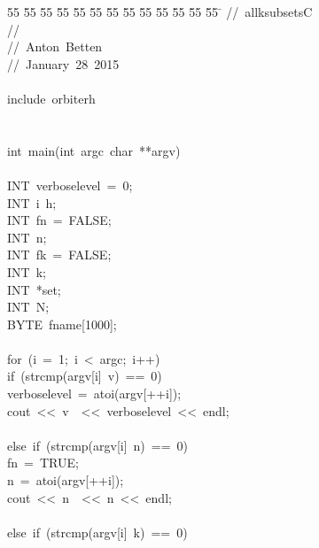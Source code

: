 %
%
\begin{tabbing}
55 \= 55 \= 55 \= 55 \= 55 \= 55 \= 55 \= 55 \= 55 \= 55 \= 55 \= 55 \= 55 \= \kill
//\ allksubsetsC\\[0pt]
//\ \\[0pt]
//\ Anton\ Betten\\[0pt]
//\ January\ 28\ 2015\\[0pt]
\\[0pt]
include\ orbiterh\\[0pt]
\\[0pt]
\\[0pt]
int\ main(int\ argc\ char\ **argv)\\[0pt]
\\[0pt]
\>INT\ verboselevel\ =\ 0;\\[0pt]
\>INT\ i\ h;\\[0pt]
\>INT\ fn\ =\ FALSE;\\[0pt]
\>INT\ n;\\[0pt]
\>INT\ fk\ =\ FALSE;\\[0pt]
\>INT\ k;\\[0pt]
\>INT\ *set;\\[0pt]
\>INT\ N;\\[0pt]
\>BYTE\ fname[1000];\\[0pt]
\\[0pt]
\>for\ (i\ =\ 1;\ i\ <\ argc;\ i++)\ \\[0pt]
\>\>if\ (strcmp(argv[i]\ v)\ ==\ 0)\ \\[0pt]
\>\>\>verboselevel\ =\ atoi(argv[++i]);\\[0pt]
\>\>\>cout\ <<\ v\ \ <<\ verboselevel\ <<\ endl;\\[0pt]
\>\>\>\\[0pt]
\>\>else\ if\ (strcmp(argv[i]\ n)\ ==\ 0)\ \\[0pt]
\>\>\>fn\ =\ TRUE;\\[0pt]
\>\>\>n\ =\ atoi(argv[++i]);\\[0pt]
\>\>\>cout\ <<\ n\ \ <<\ n\ <<\ endl;\\[0pt]
\>\>\>\\[0pt]
\>\>else\ if\ (strcmp(argv[i]\ k)\ ==\ 0)\ \\[0pt]

\end{tabbing}
